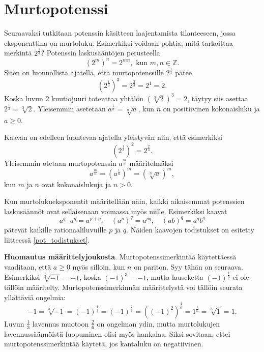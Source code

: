 \section{Murtopotenssi}

Seuraavaksi tutkitaan potenssin käsitteen laajentamista tilanteeseen, jossa eksponenttina on murtoluku.
Esimerkiksi voidaan pohtia, mitä tarkoittaa merkintä $2^\frac{1}{3}$? Potenssin laskusääntöjen perusteella
\[
(2^{m})^n = 2^{mn},\textrm{ kun }m,n\in \mathbb{Z}.
\]
Siten on luonnollista ajatella, että murtopotenssille $2^\frac{1}{3}$ pätee
\[
(2^\frac{1}{3})^3 = 2^\frac{3}{3} = 2^1=2.
\]
Koska luvun $2$ kuutiojuuri toteuttaa yhtälön $(\sqrt[3]{2})^3=2$, täytyy siis asettaa $2^\frac{1}{3}=\sqrt[3]{2}$. Yleisemmin asetetaan $a^\frac{1}{n} =\sqrt[n]{a}$, kun $n$ on positiivinen kokonaisluku ja $a\ge 0$.

Kaavan on edelleen luontevaa ajatella yleistyvän niin, että esimerkiksi
\[
(2^{\frac{1}{3}})^2 = 2^{\frac{2}{3}}.
\]
Yleisemmin otetaan murtopotenssin $a^\frac{m}{n}$ määritelmäksi
\[
a^\frac{m}{n} = (a^{\frac{1}{n}})^m = (\sqrt[n]{a})^m,
\]
kun $m$ ja $n$ ovat kokonaislukuja ja $n>0$. 



Kun murtolukueksponentit määritellään näin, kaikki aikaisemmat potenssien
laskusäännöt ovat sellaisenaan voimassa myös niille. Esimerkiksi kaavat
\[ a^q\cdot a^q = a^{p+q}, \quad (a^p)^q = a^{pq}, \quad (ab)^q=a^qb^q \]
pätevät kaikille rationaaliluvuille $p$ ja $q$.  Näiden kaavojen todistukset on esitetty liitteessä \ref{pot_todistukset}.

{\bf Huomautus määrittelyjoukosta}. Murtopotenssimerkintää käytettäessä vaaditaan, että $a\geq 0$ myös silloin, kun $n$ on pariton. Syy tähän on seuraava. Esimerkiksi $\sqrt[3]{-1}=-1$, koska $(-1)^3=-1$, mutta lauseketta $(-1)^\frac{1}{3}$ ei ole tällöin määritelty. Murtopotenssimerkinnän määrittelystä voi tällöin seurata yllättäviä ongelmia:
\[
 -1 = \sqrt[3]{-1} = (-1)^\frac{1}{3} = (-1)^\frac{2}{6}
= ((-1)^2)^\frac{1}{6} = 1^\frac{1}{6} = \sqrt[6]{1} = 1. 
\]
Luvun $\frac{1}{3}$ lavennus muotoon $\frac{2}{6}$ on ongelman ydin, mutta murtolukujen lavennussäännöistä luopuminen olisi myös hankalaa. Siksi sovitaan, ettei murtopotenssimerkintää käytetä, jos kantaluku on negatiivinen.

